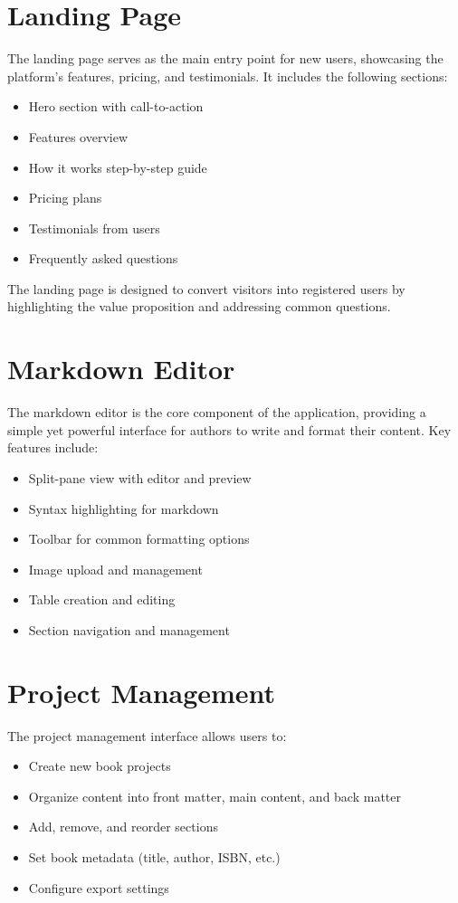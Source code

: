 \documentclass[12pt,a4paper]{book}
\begin{document}
\section{Landing Page}

The landing page serves as the main entry point for new users, showcasing the platform's features, pricing, and testimonials. It includes the following sections:

\begin{itemize}
  \item Hero section with call-to-action
  \item Features overview
  \item How it works step-by-step guide
  \item Pricing plans
  \item Testimonials from users
  \item Frequently asked questions
\end{itemize}

The landing page is designed to convert visitors into registered users by highlighting the value proposition and addressing common questions.

\section{Markdown Editor}

The markdown editor is the core component of the application, providing a simple yet powerful interface for authors to write and format their content. Key features include:

\begin{itemize}
  \item Split-pane view with editor and preview
  \item Syntax highlighting for markdown
  \item Toolbar for common formatting options
  \item Image upload and management
  \item Table creation and editing
  \item Section navigation and management
\end{itemize}

\section{Project Management}

The project management interface allows users to:

\begin{itemize}
  \item Create new book projects
  \item Organize content into front matter, main content, and back matter
  \item Add, remove, and reorder sections
  \item Set book metadata (title, author, ISBN, etc.)
  \item Configure export settings
\end{itemize}
\end{document}
